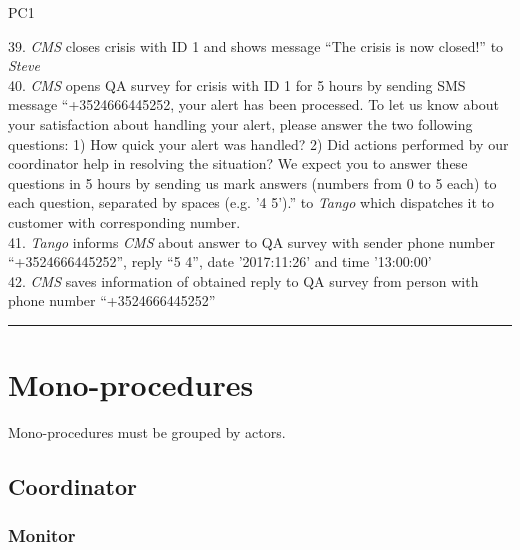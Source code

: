 \begin{lyxlist}{PC1}
{39. \emph{CMS} closes crisis with ID 1 and shows message ``The crisis is now
closed!'' to \emph{Steve}\\
40. \emph{CMS} opens QA survey for crisis with ID 1 for 5 hours by sending SMS
message ``+3524666445252, your alert has been processed. To let us know about
your satisfaction about handling your alert, please answer the two following
questions: 1) How quick your alert was handled? 2) Did actions performed by our
coordinator help in resolving the situation? We expect you to answer these
questions in 5 hours by sending us mark answers (numbers from 0 to 5 each) to
each question, separated by spaces (e.g. '4 5').'' to \emph{Tango} which
dispatches it to customer with corresponding number.\\
41. \emph{Tango} informs \emph{CMS} about answer to QA survey with sender phone
number ``+3524666445252'', reply ``5 4'', date '2017:11:26' and time
'13:00:00'\\
42. \emph{CMS} saves information of obtained reply to QA survey from person
with phone number ``+3524666445252''


}

\end{lyxlist}
\hrule


\section{Mono-procedures}
Mono-procedures must be grouped by actors.

\subsection{Coordinator}

\subsubsection{Monitor}

